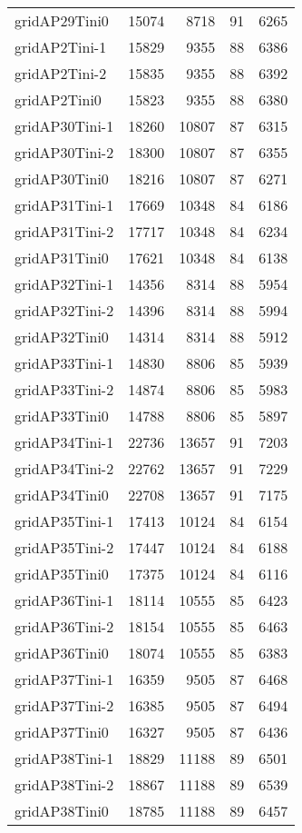 \documentclass[../../../thesis.tex]{subfiles}
\begin{document}
\begin{longtable}{lrrrr}
gridAP29Tini0 & 15074 & 8718 & 91 & 6265 \\
gridAP2Tini-1 & 15829 & 9355 & 88 & 6386 \\
gridAP2Tini-2 & 15835 & 9355 & 88 & 6392 \\
gridAP2Tini0 & 15823 & 9355 & 88 & 6380 \\
gridAP30Tini-1 & 18260 & 10807 & 87 & 6315 \\
gridAP30Tini-2 & 18300 & 10807 & 87 & 6355 \\
gridAP30Tini0 & 18216 & 10807 & 87 & 6271 \\
gridAP31Tini-1 & 17669 & 10348 & 84 & 6186 \\
gridAP31Tini-2 & 17717 & 10348 & 84 & 6234 \\
gridAP31Tini0 & 17621 & 10348 & 84 & 6138 \\
gridAP32Tini-1 & 14356 & 8314 & 88 & 5954 \\
gridAP32Tini-2 & 14396 & 8314 & 88 & 5994 \\
gridAP32Tini0 & 14314 & 8314 & 88 & 5912 \\
gridAP33Tini-1 & 14830 & 8806 & 85 & 5939 \\
gridAP33Tini-2 & 14874 & 8806 & 85 & 5983 \\
gridAP33Tini0 & 14788 & 8806 & 85 & 5897 \\
gridAP34Tini-1 & 22736 & 13657 & 91 & 7203 \\
gridAP34Tini-2 & 22762 & 13657 & 91 & 7229 \\
gridAP34Tini0 & 22708 & 13657 & 91 & 7175 \\
gridAP35Tini-1 & 17413 & 10124 & 84 & 6154 \\
gridAP35Tini-2 & 17447 & 10124 & 84 & 6188 \\
gridAP35Tini0 & 17375 & 10124 & 84 & 6116 \\
gridAP36Tini-1 & 18114 & 10555 & 85 & 6423 \\
gridAP36Tini-2 & 18154 & 10555 & 85 & 6463 \\
gridAP36Tini0 & 18074 & 10555 & 85 & 6383 \\
gridAP37Tini-1 & 16359 & 9505 & 87 & 6468 \\
gridAP37Tini-2 & 16385 & 9505 & 87 & 6494 \\
gridAP37Tini0 & 16327 & 9505 & 87 & 6436 \\
gridAP38Tini-1 & 18829 & 11188 & 89 & 6501 \\
gridAP38Tini-2 & 18867 & 11188 & 89 & 6539 \\
gridAP38Tini0 & 18785 & 11188 & 89 & 6457 \\

\end{longtable}
\end{document}
